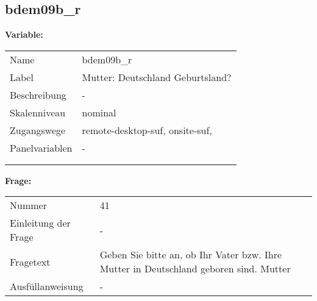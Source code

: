 	
	
	\subsection{bdem09b\_r}
	\label{subSection:bdem09b_r}

	\noindent\textbf{Variable:}\\
		\begin{tabular}{lL{11.3cm}}
			\label{tableVariable:bdem09b_r}
			Name & bdem09b\_r \\
			Label & Mutter: Deutschland Geburtsland? \\
			Beschreibung & - \\
			Skalenniveau & nominal \\
			Zugangswege &
				remote-desktop-suf,
				onsite-suf,
 \\
			Panelvariablen & -
			 \\
			 \\
 \\
		\end{tabular}

		\vspace*{1 cm}
		\noindent\textbf{Frage:}\\
		\begin{tabular}{lL{11.3cm}}
			\label{tableQuestion:bdem09b_r}
			Nummer & 41 \\
			Einleitung der Frage & - \\
			Fragetext & Geben Sie bitte an, ob Ihr Vater bzw. Ihre Mutter in Deutschland geboren sind.
Mutter \\
			Ausfüllanweisung & - \\
		\end{tabular}





